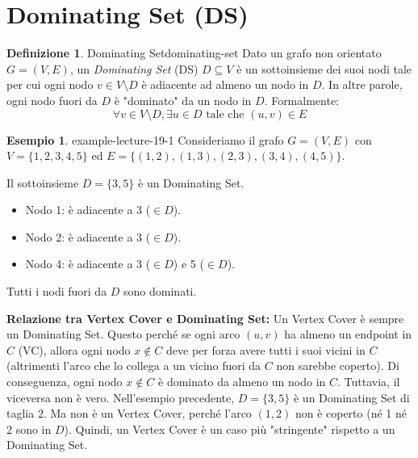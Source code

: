 \documentclass[a4paper]{article}
\theoremstyle{definition} %
\newtheorem{definition}{Definizione}[section]
\newtheorem{example}{Esempio}[section]
\theoremstyle{definition} %
\begin{document}
\section{Dominating Set (DS)}

\begin{definition}{Dominating Set}{dominating-set}
Dato un grafo non orientato $G=(V, E)$, un \emph{Dominating Set} (DS) $D \subseteq V$ è un sottoinsieme dei suoi nodi tale per cui ogni nodo $v \in V \setminus D$ è adiacente ad almeno un nodo in $D$. In altre parole, ogni nodo fuori da $D$ è "dominato" da un nodo in $D$. Formalmente:
\[ \forall v \in V \setminus D, \exists u \in D \text{ tale che } (u, v) \in E \]
\end{definition}

\begin{example}{}{{ example-lecture-19-1 }}
Consideriamo il grafo $G=(V, E)$ con $V=\{1,2,3,4,5\}$ ed $E=\{(1,2), (1,3), (2,3), (3,4), (4,5)\}$.
\begin{center}
\end{center}
Il sottoinsieme $D=\{3,5\}$ è un Dominating Set.
\begin{itemize}
    \item Nodo 1: è adiacente a 3 ($\in D$).
    \item Nodo 2: è adiacente a 3 ($\in D$).
    \item Nodo 4: è adiacente a 3 ($\in D$) e 5 ($\in D$).
\end{itemize}
Tutti i nodi fuori da $D$ sono dominati.
\end{example}

\textbf{Relazione tra Vertex Cover e Dominating Set:}
Un Vertex Cover è sempre un Dominating Set. Questo perché se ogni arco $(u,v)$ ha almeno un endpoint in $C$ (VC), allora ogni nodo $x \notin C$ deve per forza avere tutti i suoi vicini in $C$ (altrimenti l'arco che lo collega a un vicino fuori da $C$ non sarebbe coperto). Di conseguenza, ogni nodo $x \notin C$ è dominato da almeno un nodo in $C$.
Tuttavia, il viceversa non è vero. Nell'esempio precedente, $D=\{3,5\}$ è un Dominating Set di taglia 2. Ma non è un Vertex Cover, perché l'arco $(1,2)$ non è coperto (né 1 né 2 sono in $D$).
Quindi, un Vertex Cover è un caso più "stringente" rispetto a un Dominating Set.
\end{document}
